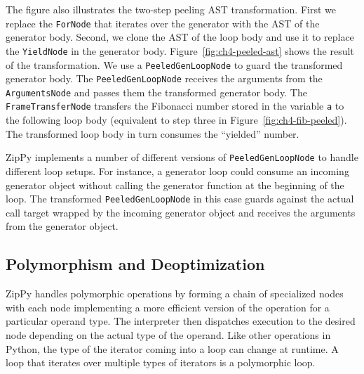 The figure also illustrates the two-step peeling AST transformation.
First we replace the \texttt{ForNode} that iterates over the generator with the AST of the generator body.
Second, we clone the AST of the loop body and use it to replace the \texttt{YieldNode} in the generator body.
Figure~\ref{fig:ch4-peeled-ast} shows the result of the transformation.
We use a \texttt{PeeledGenLoopNode} to guard the transformed generator body.
The \texttt{PeeledGenLoopNode} receives the arguments from the \texttt{ArgumentsNode} and passes them the transformed generator body.
The \texttt{FrameTransferNode} transfers the Fibonacci number stored in the variable \texttt{a} to the following loop body (equivalent to step three in Figure~\ref{fig:ch4-fib-peeled}).
The transformed loop body in turn consumes the ``yielded'' number.

ZipPy implements a number of different versions of \texttt{PeeledGenLoopNode} to handle different loop setups.
For instance, a generator loop could consume an incoming generator object without calling the generator function at the beginning of the loop.
The transformed \texttt{PeeledGenLoopNode} in this case guards against the actual call target wrapped by the incoming generator object and receives the arguments from the generator object.

\subsection{Polymorphism and Deoptimization}
\label{sec:ch4-polymorphic-and-deopt}

ZipPy handles polymorphic operations by forming a chain of specialized nodes with each node implementing a more efficient version of the operation for a particular operand type.
The interpreter then dispatches execution to the desired node depending on the actual type of the operand.
Like other operations in Python, the type of the iterator coming into a loop can change at runtime.
A loop that iterates over multiple types of iterators is a polymorphic loop.

